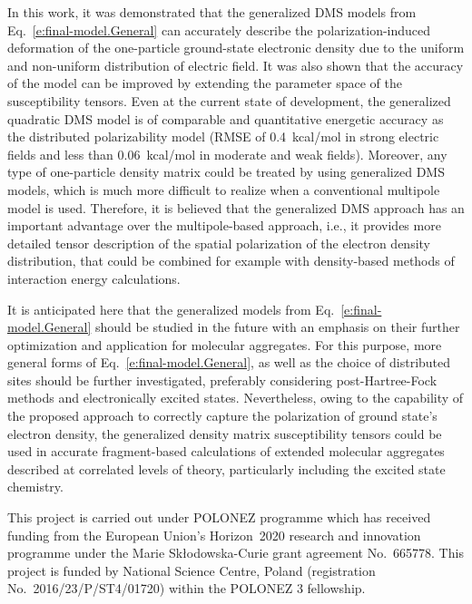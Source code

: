 \documentclass[aip,jcp,preprint,amsmath,amssymb,floatfix]{revtex4-1}
\newcommand*{\InlineImage}[1]{%
    \raisebox{-.02\baselineskip}{%
        \texttt{[image: \#1]}%
    }%
}
\begin{document}
In this work, it was demonstrated that the generalized DMS models from Eq.~\eqref{e:final-model.General}
can accurately describe the polarization\hyp{}induced deformation 
of the one\hyp{}particle ground\hyp{}state electronic density
due to the uniform and non\hyp{}uniform distribution of electric field.
It was also shown that the accuracy of the model can be improved 
by extending the parameter space of the susceptibility tensors.
Even at the current state of development, the generalized quadratic DMS model
is of comparable and quantitative energetic accuracy as the distributed 
polarizability model (RMSE of 0.4~kcal/mol in strong 
electric fields and less than 0.06~kcal/mol in moderate and weak fields).
Moreover, any type of one\hyp{}particle density matrix could be treated by using
generalized DMS models, which is much more difficult to realize when a conventional multipole
model is used. Therefore, it is believed that the generalized DMS approach
has an important advantage over the multipole\hyp{}based approach, i.e., it provides more detailed
tensor description of the spatial polarization of the electron density distribution, that could be
combined for example with density\hyp{}based methods of interaction energy calculations.\cite{Mandado.Hermida-Ramon.JCTC.2011}

It is anticipated here that the generalized models from Eq.~\eqref{e:final-model.General}
should be studied in the future with an emphasis 
on their further optimization and application for molecular aggregates.
For this purpose, more general forms of Eq.~\eqref{e:final-model.General}, 
as well as the choice of distributed
sites should be further investigated, preferably considering post\hyp{}Hartree\hyp{}Fock methods
and electronically excited states.
Nevertheless, owing to the capability of the proposed approach to correctly capture the 
polarization of ground state's electron density,
the generalized density matrix susceptibility tensors 
could be used in accurate fragment\hyp{}based calculations of extended molecular aggregates
described at correlated levels of theory, particularly including the excited state chemistry.

\begin{acknowledgments}
This project is carried out under POLONEZ programme which has received funding from the European Union's
Horizon~2020 research and innovation programme under the Marie Skłodowska-Curie grant agreement 
No.~665778. \InlineImage{eu-logo.eps} This project is funded by National Science Centre, Poland 
(registration No.~2016/23/P/ST4/01720) within the POLONEZ 3 fellowship. 
\end{acknowledgments}
\end{document}
